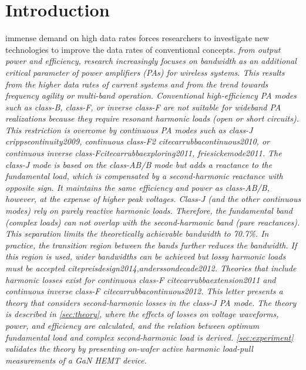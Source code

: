 \documentclass[journal]{IEEEtran}
\begin{document}
\section{Introduction}
\label{sec:introduction}
 immense demand on high data rates forces researchers to investigate new technologies to improve the data rates of conventional concepts.
 {\itshape from output power and efficiency, research increasingly
focuses on bandwidth as an additional critical parameter of power amplifiers
(PAs) for wireless systems. This results from the higher data rates of current
systems and from the trend towards frequency agility or multi-band operation.
%
Conventional high-efficiency PA modes such as class-B, class-F, or inverse
class-F are not suitable for wideband PA realizations because they require
resonant harmonic loads (open or short circuits). This restriction is overcome
by continuous PA modes such as class-J crippscontinuity2009,
continuous class-F2
citecarrubbacontinuous2010,
or continuous inverse class-Fcitecarrubbaexploring2011, friesickemode2011.
%
The class-J mode is based on the class-AB/B mode but adds a reactance to the
fundamental load, which is compensated by a second-harmonic reactance with
opposite sign. It maintains the same efficiency and power as class-AB/B,
however, at the expense of higher peak voltages. Class-J (and the other
continuous modes) rely on purely reactive harmonic loads. Therefore, the
fundamental band (complex loads) can not overlap with the second-harmonic band
(pure reactances). This separation limits the theoretically achievable
bandwidth to 70.7\%. In practice, the transition region between the bands
further reduces the bandwidth. If this region is used, wider bandwidths can be
achieved but lossy harmonic loads must be accepted
cite{preisdesign2014,anderssondecade2012}.
%
Theories that include harmonic losses exist for continuous class-F
cite{carrubbaextension2011}
and continuous inverse class-F
cite{carrubbacontinuous2012}.
This letter presents a theory that considers second-harmonic losses in the
class-J PA mode. The theory is described in \cref{sec:theory}, where the
effects of losses on voltage waveforms, power, and efficiency are calculated,
and the relation between optimum fundamental load and complex second-harmonic
load is derived. \cref{sec:experiment} validates the theory by presenting
on-wafer active harmonic load-pull measurements of a GaN HEMT device.}
%
%
\end{document}
